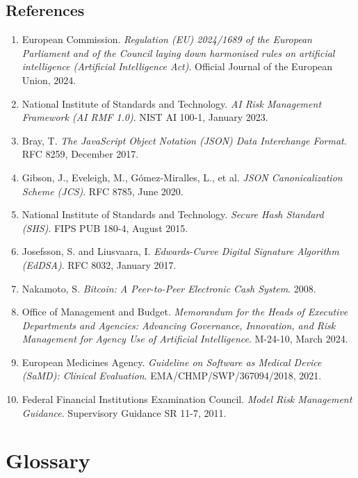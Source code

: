 \documentclass[12pt,a4paper]{article}
\begin{document}
\subsection{References}

\begin{enumerate}
\item European Commission. \textit{Regulation (EU) 2024/1689 of the European Parliament and of the Council laying down harmonised rules on artificial intelligence (Artificial Intelligence Act)}. Official Journal of the European Union, 2024.

\item National Institute of Standards and Technology. \textit{AI Risk Management Framework (AI RMF 1.0)}. NIST AI 100-1, January 2023.

\item Bray, T. \textit{The JavaScript Object Notation (JSON) Data Interchange Format}. RFC 8259, December 2017.

\item Gibson, J., Eveleigh, M., Gómez-Miralles, L., et al. \textit{JSON Canonicalization Scheme (JCS)}. RFC 8785, June 2020.

\item National Institute of Standards and Technology. \textit{Secure Hash Standard (SHS)}. FIPS PUB 180-4, August 2015.

\item Josefsson, S. and Liusvaara, I. \textit{Edwards-Curve Digital Signature Algorithm (EdDSA)}. RFC 8032, January 2017.

\item Nakamoto, S. \textit{Bitcoin: A Peer-to-Peer Electronic Cash System}. 2008.

\item Office of Management and Budget. \textit{Memorandum for the Heads of Executive Departments and Agencies: Advancing Governance, Innovation, and Risk Management for Agency Use of Artificial Intelligence}. M-24-10, March 2024.

\item European Medicines Agency. \textit{Guideline on Software as Medical Device (SaMD): Clinical Evaluation}. EMA/CHMP/SWP/367094/2018, 2021.

\item Federal Financial Institutions Examination Council. \textit{Model Risk Management Guidance}. Supervisory Guidance SR 11-7, 2011.
\end{enumerate}

\section{Glossary}
\end{document}
